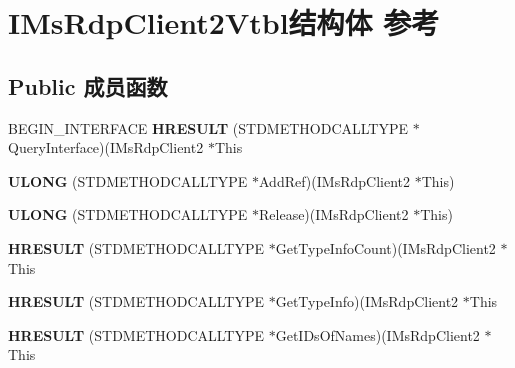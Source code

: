 \hypertarget{struct_i_ms_rdp_client2_vtbl}{}\section{I\+Ms\+Rdp\+Client2\+Vtbl结构体 参考}
\label{struct_i_ms_rdp_client2_vtbl}
\subsection*{Public 成员函数}
\begin{DoxyCompactItemize}
\item 
\mbox{\label{struct_i_ms_rdp_client2_vtbl_a471d0443d470e7fd4f5efd84347e1635}} 
B\+E\+G\+I\+N\+\_\+\+I\+N\+T\+E\+R\+F\+A\+CE {\bfseries H\+R\+E\+S\+U\+LT} (S\+T\+D\+M\+E\+T\+H\+O\+D\+C\+A\+L\+L\+T\+Y\+PE $\ast$Query\+Interface)(I\+Ms\+Rdp\+Client2 $\ast$This
\item 
\mbox{\label{struct_i_ms_rdp_client2_vtbl_a85b78baa4ebc0ab13ebdf03abe9889e2}} 
{\bfseries U\+L\+O\+NG} (S\+T\+D\+M\+E\+T\+H\+O\+D\+C\+A\+L\+L\+T\+Y\+PE $\ast$Add\+Ref)(I\+Ms\+Rdp\+Client2 $\ast$This)
\item 
\mbox{\label{struct_i_ms_rdp_client2_vtbl_a46098b7fbcac0a636127de57b9b91c93}} 
{\bfseries U\+L\+O\+NG} (S\+T\+D\+M\+E\+T\+H\+O\+D\+C\+A\+L\+L\+T\+Y\+PE $\ast$Release)(I\+Ms\+Rdp\+Client2 $\ast$This)
\item 
\mbox{\label{struct_i_ms_rdp_client2_vtbl_a3d2f425b859d5496aeb368f6b0d1dcbb}} 
{\bfseries H\+R\+E\+S\+U\+LT} (S\+T\+D\+M\+E\+T\+H\+O\+D\+C\+A\+L\+L\+T\+Y\+PE $\ast$Get\+Type\+Info\+Count)(I\+Ms\+Rdp\+Client2 $\ast$This
\item 
\mbox{\label{struct_i_ms_rdp_client2_vtbl_aaf033c921053d3119076478592f82637}} 
{\bfseries H\+R\+E\+S\+U\+LT} (S\+T\+D\+M\+E\+T\+H\+O\+D\+C\+A\+L\+L\+T\+Y\+PE $\ast$Get\+Type\+Info)(I\+Ms\+Rdp\+Client2 $\ast$This
\item 
\mbox{\label{struct_i_ms_rdp_client2_vtbl_a2ba6403dc7aea7688cb06905f813978f}} 
{\bfseries H\+R\+E\+S\+U\+LT} (S\+T\+D\+M\+E\+T\+H\+O\+D\+C\+A\+L\+L\+T\+Y\+PE $\ast$Get\+I\+Ds\+Of\+Names)(I\+Ms\+Rdp\+Client2 $\ast$This

\end{DoxyCompactItemize}
